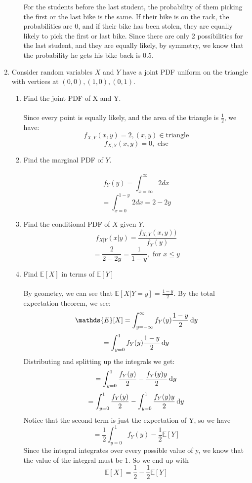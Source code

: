 \begin{enumerate}
\begin{enumerate}
        For the students before the last student, the probability of them picking the first or the last bike is the same. If their bike is on the rack, the probabilities are 0, and if their bike has been stolen, they are equally likely to pick the first or last bike. Since there are only 2 possibilities for the last student, and they are equally likely, by symmetry, we know that the probability he gets his bike back is $0.5$.
    \end{enumerate}
  \item Consider random variables $X$ and $Y$ have a joint PDF uniform on the triangle with vertices at $(0,0), (1,0), (0,1)$.
    \begin{enumerate}
      \item Find the joint PDF of X and Y.\\\\
        
        Since every point is equally likely, and the area of the triangle is $\frac{1}{2}$, we have:
        $$f_{X,Y}(x,y) = 2, (x,y) \in \text{triangle}$$
        $$f_{X,Y}(x,y) = 0, \text{ else}$$

      \item Find the marginal PDF of $Y$.\\\\
        $$f_Y(y) = \int_{x=\infty}^{\infty} 2 dx$$
        $$= \int_{x=0}^{1-y} 2 dx = 2- 2y$$

      \item Find the conditional PDF of $X$ given $Y$.
        $$f_{X|Y}(x|y) = \frac{f_{X,Y}(x,y))}{f_Y(y)}$$
        $$= \frac{2}{2-2y} = \frac{1}{1-y}, \text{ for } x \leq y$$

      \item Find $\mathds{E}[X]$ in terms of $\mathds{E}[Y]$\\\\
        
        By geometry, we can see that $\mathds{E}[X | Y = y] = \frac{1-y}{2}$. By the total expectation theorem, we see:
        $$\mathds{E}[X] = \int_{y=-\infty}^{\infty} f_Y(y) \frac{1-y}{2} \d{y}$$
        $$= \int_{y=0}^{1} f_Y(y) \frac{1-y}{2} \operatorname{d}\!{y}$$
        Distributing and splitting up the integrals we get:
        $$= \int_{y=0}^{1} \frac{f_Y(y)}{2} -  \frac{f_Y(y)y}{2} \operatorname{d}\!{y}$$
        $$= \int_{y=0}^{1} \frac{f_Y(y)}{2} - \int_{y=0}^{1} \frac{f_Y(y)y}{2} \operatorname{d}\!{y}$$
        Notice that the second term is just the expectation of Y, so we have
        $$= \frac{1}{2} \int_{y=0}^{1} f_Y(y) - \frac{1}{2} \mathds{E}[Y]$$
        Since the integral integrates over every possible value of y, we know that the value of the integral must be 1. So we end up with
        $$\mathds{E}[X] = \frac{1}{2} - \frac{1}{2}\mathds{E}[Y]$$


\end{enumerate}
\end{enumerate}
